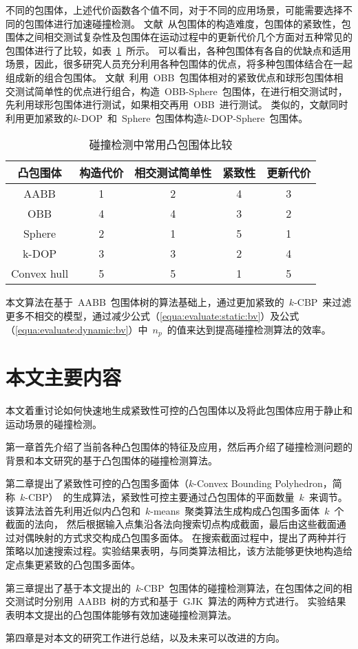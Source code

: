 不同的包围体，上述代价函数各个值不同，对于不同的应用场景，可能需要选择不同的包围体进行加速碰撞检测。
文献~从包围体的构造难度，包围体的紧致性，包围体之间相交测试复杂性及包围体在运动过程中的更新代价几个方面对五种常见的包围体进行了比较，如表~\ref{lbl:table:bv-comp}~所示。
可以看出，各种包围体有各自的优缺点和适用场景，因此，很多研究人员充分利用各种包围体的优点，将多种包围体结合在一起组成新的组合包围体。
文献~利用~OBB~包围体相对的紧致优点和球形包围体相交测试简单性的优点进行组合，构造~OBB-Sphere~包围体，在进行相交测试时，先利用球形包围体进行测试，如果相交再用~OBB~进行测试。
类似的，文献同时利用更加紧致的$k$-DOP~和~Sphere~包围体构造$k$-DOP-Sphere~包围体。

\begin{table}[htbp]
\centering
\caption{碰撞检测中常用凸包围体比较}
\begin{tabular}{ccccc}
\toprule[1.5pt]
凸包围体 & 构造代价 & 相交测试简单性 & 紧致性 & 更新代价\\
\midrule[1.0pt]
AABB   & 1 & 2 & 4 & 3\\
OBB    & 4 & 4 & 3 & 2\\
Sphere & 2 & 1 & 5 & 1\\
k-DOP  & 3 & 3 & 2 & 4\\
Convex hull & 5 & 5 & 1 & 5 \\
\bottomrule[1.5pt]
\end{tabular}
\label{lbl:table:bv-comp}
\end{table}

本文算法在基于~AABB~包围体树的算法基础上，通过更加紧致的~$k$-CBP~来过滤更多不相交的模型，通过减少公式（\ref{equa:evaluate:static:bv}）及公式（\ref{equa:evaluate:dynamic:bv}）中~$n_p$~的值来达到提高碰撞检测算法的效率。

\section{本文主要内容}
\label{sec:structure}
本文着重讨论如何快速地生成紧致性可控的凸包围体以及将此包围体应用于静止和运动场景的碰撞检测。

第一章首先介绍了当前各种凸包围体的特征及应用，然后再介绍了碰撞检测问题的背景和本文研究的基于凸包围体的碰撞检测算法。

第二章提出了紧致性可控的凸包围多面体（$k$-Convex Bounding Polyhedron，简称~$k$-CBP）~的生成算法，紧致性可控主要通过凸包围体的平面数量~$k$~来调节。
该算法法首先利用近似内凸包和~$k$-means~聚类算法生成构成凸包围多面体~$k$~个截面的法向，
然后根据输入点集沿各法向搜索切点构成截面，最后由这些截面通过对偶映射的方式求交构成凸包围多面体。
在搜索截面过程中，提出了两种并行策略以加速搜索过程。实验结果表明，与同类算法相比，该方法能够更快地构造给定点集更紧致的凸包围多面体。

第三章提出了基于本文提出的~$k$-CBP~包围体的碰撞检测算法，在包围体之间的相交测试时分别用~AABB~树的方式和基于~GJK~算法的两种方式进行。
实验结果表明本文提出的凸包围体能够有效加速碰撞检测算法。

第四章是对本文的研究工作进行总结，以及未来可以改进的方向。

